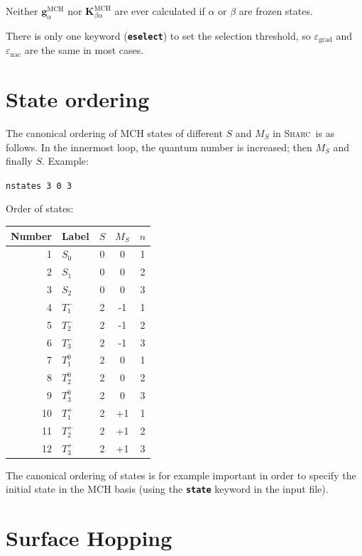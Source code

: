 \documentclass[a4paper,11pt,DIV=15,openany,twoside=false]{scrbook}
\newcommand{\sharc}{\textsc{Sharc}}
\newcommand{\ttt}[1]{\textbf{\texttt{#1}}}
\newcommand{\VEC}[1]{\ensuremath{\mathbf{#1}}}
\newenvironment{example}{
  \vspace{0mm}
  \definecolor{shadecolor}{HTML}{BBDDFF}
  \begin{shaded}
  \begin{minipage}{0.9\textwidth}
}{
  \end{minipage}
  \end{shaded}
}
\begin{document}
Neither $\VEC{g}^{\text{MCH}}_\alpha$ nor $\VEC{K}^{\text{MCH}}_{\beta\alpha}$ are ever calculated if $\alpha$ or $\beta$ are frozen states.

There is only one keyword (\ttt{eselect}) to set the selection threshold, so $\varepsilon_\text{grad}$ and $\varepsilon_\text{nac}$ are the same in most cases. 


\section{State ordering}\label{met:ordering}

The canonical ordering of MCH states of different $S$ and $M_S$ in \sharc\ is as follows. In the innermost loop, the quantum number is increased; then $M_S$ and finally $S$. Example:

  \verb|nstates 3 0 3|

  Order of states:

  \begin{tabular}{rlccc}
    \toprule
    Number      &Label       &$S$ &$M_S$  &$n$\\
    \midrule
    1&$S_0$       &0&0&1\\
    2&$S_1$       &0&0&2\\
    3&$S_2$       &0&0&3\\
    4&$T_1^-$       &2&-1&1\\
    5&$T_2^-$       &2&-1&2\\
    6&$T_3^-$       &2&-1&3\\
    7&$T_1^0$       &2&0&1\\
    8&$T_2^0$       &2&0&2\\
    9&$T_3^0$       &2&0&3\\
    10&$T_1^+$       &2&+1&1\\
    11&$T_2^+$       &2&+1&2\\
    12&$T_3^+$       &2&+1&3\\
    \bottomrule
  \end{tabular}

The canonical ordering of states is for example important in order to specify the initial state in the MCH basis (using the \ttt{state} keyword in the input file).


\section{Surface Hopping}
\end{document}

